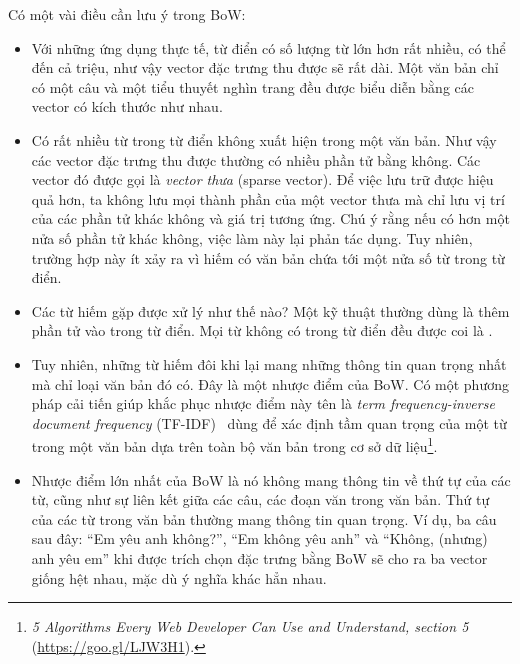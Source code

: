 Có một vài điều cần lưu ý trong BoW: 
\begin{itemize}
    \item Với những ứng dụng thực tế, {từ điển} có số lượng từ lớn hơn rất
    nhiều, có thể đến cả triệu, như vậy vector đặc trưng thu được sẽ rất dài.
    Một văn bản chỉ có một câu và một tiểu thuyết nghìn trang đều được biểu
    diễn bằng các vector có kích thước như nhau.

    \item Có rất nhiều từ trong từ điển không xuất hiện trong một văn bản. Như
    vậy các vector đặc trưng thu được thường có nhiều phần tử bằng không.
    Các vector đó được gọi là \textit{vector thưa} (sparse vector). Để việc lưu trữ được hiệu quả hơn, ta không lưu mọi thành phần của một
    vector thưa mà chỉ lưu {vị trí} của các phần tử khác không và {giá
    trị} tương ứng. Chú ý rằng nếu có hơn một nửa số phần tử khác không, việc
    làm này lại phản tác dụng. Tuy nhiên, trường hợp này ít xảy ra vì hiếm có
    văn bản chứa tới một nửa số từ trong từ điển.

    \item Các từ hiếm gặp được xử lý như thế nào? Một kỹ thuật thường dùng là
    thêm phần tử  vào trong từ điển. Mọi từ không có
    trong từ điển đều được coi là
    .

    \item Tuy nhiên, những từ hiếm đôi khi lại mang những thông tin quan
    trọng nhất mà chỉ loại văn bản đó có. Đây là một nhược điểm của BoW. Có một
    phương pháp cải tiến giúp khắc phục nhược điểm này tên là \textit{term
    frequency-inverse document frequency} (TF-IDF)~\cite{salton1975vector} dùng
    để xác định tầm quan trọng của một từ trong một văn bản dựa trên toàn bộ văn
    bản trong cơ sở dữ liệu\footnote{\textit{5 Algorithms Every Web Developer
    Can Use and Understand, section 5} (\url{https://goo.gl/LJW3H1}).}.

    \item Nhược điểm lớn nhất của BoW là nó không mang thông tin về thứ tự của
    các từ, cũng như sự liên kết giữa các câu, các đoạn văn trong văn bản. Thứ
    tự của các từ trong văn bản thường mang thông tin quan trọng. Ví dụ, ba câu
    sau đây: ``Em yêu anh không?'', ``Em không yêu anh'' và ``Không, (nhưng)
    anh yêu em'' khi được trích chọn đặc trưng bằng BoW sẽ cho ra ba vector
    giống hệt nhau, mặc dù ý nghĩa khác hẳn nhau.
\end{itemize}
 
